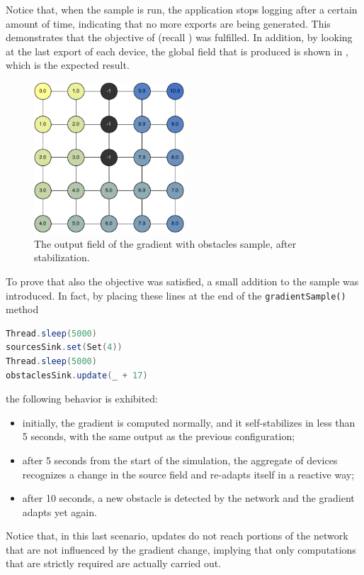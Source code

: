 Notice that, when the sample is run, the application stops logging after a certain amount of time, indicating that no more exports are being generated.
%
This demonstrates that the objective of  (recall ) was fulfilled.
%
In addition, by looking at the last export of each device, the global field that is produced is shown in , which is the expected result.
%
\begin{figure}
    \centering
    \includegraphics[width=0.5\textwidth]{figures/samples/gradient-result.pdf}
    \caption{The output field of the gradient with obstacles sample, after stabilization.}
    \label{fig:gradient-result}
\end{figure}

To prove that also the  objective was satisfied, a small addition to the sample was introduced.
%
In fact, by placing these lines at the end of the \texttt{gradientSample()} method
%
\begin{lstlisting}[frame=single, language=scala]
Thread.sleep(5000)
sourcesSink.set(Set(4))
Thread.sleep(5000)
obstaclesSink.update(_ + 17)
\end{lstlisting}
%
the following behavior is exhibited:
%
\begin{itemize}
  \item initially, the gradient is computed normally, and it self-stabilizes in less than 5 seconds, with the same output as the previous configuration;
  \item after 5 seconds from the start of the simulation, the aggregate of devices recognizes a change in the source field and re-adapts itself in a reactive way;
  \item after 10 seconds, a new obstacle is detected by the network and the gradient adapts yet again.
\end{itemize}
%
Notice that, in this last scenario, updates do not reach portions of the network that are not influenced by the gradient change, implying that only computations that are strictly required are actually carried out.

